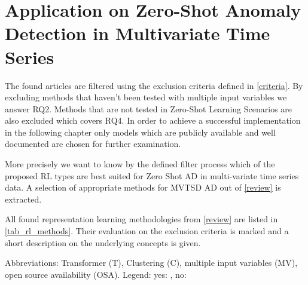 \section{Application on Zero-Shot Anomaly Detection in Multivariate Time Series}\label{application}
The found articles are filtered using the exclusion criteria defined in \autoref{criteria}. By excluding methods that haven't been tested with multiple input variables we answer RQ2. Methods that are not tested in Zero-Shot Learning Scenarios are also excluded which covers RQ4.  In order to achieve a successful implementation in the following chapter only models which are publicly available and well documented are chosen for further examination.

More precisely we want to know by the defined filter process which of the proposed RL types are best suited for Zero Shot AD in multi-variate time series data. A selection of appropriate methods for MVTSD AD out of \autoref{review} is extracted.

All found representation learning methodologies from \autoref{review} are listed in \autoref{tab_rl_methods}. Their evaluation on the exclusion criteria is marked and a short description on the underlying concepts is given.
 \begin{table}
   \caption{Abbreviations: Transformer (T), Clustering (C), multiple input variables (MV), open source availability (OSA). Legend: yes: \cmark, no: \xmark}\label{tab_rl_methods}
   
 \end{table}
